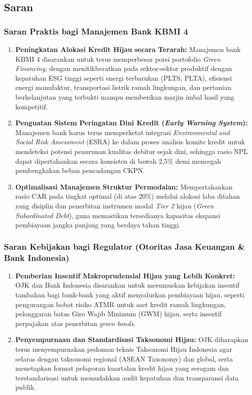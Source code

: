 \documentclass[12pt,a4paper]{article}
\numberwithin{equation}{section}
\begin{document}
\subsection{Saran}

\subsubsection{Saran Praktis bagi Manajemen Bank KBMI 4}
\begin{enumerate}[label=\alph*.]
  \item \textbf{Peningkatan Alokasi Kredit Hijau secara Terarah:} Manajemen bank KBMI 4 disarankan untuk terus memperbesar porsi portofolio \emph{Green Financing}, dengan menitikberatkan pada sektor-sektor produktif dengan kepatuhan ESG tinggi seperti energi terbarukan (PLTS, PLTA), efisiensi energi manufaktur, transportasi listrik ramah lingkungan, dan pertanian berkelanjutan yang terbukti mampu memberikan marjin imbal hasil yang kompetitif.
  \item \textbf{Penguatan Sistem Peringatan Dini Kredit (\emph{Early Warning System}):} Manajemen bank harus terus memperketat integrasi \emph{Environmental and Social Risk Assessment} (ESRA) ke dalam proses analisis komite kredit untuk mendeteksi potensi penurunan kualitas debitur sejak dini, sehingga rasio NPL dapat dipertahankan secara konsisten di bawah 2,5\% demi mencegah pembengkakan beban pencadangan CKPN.
  \item \textbf{Optimalisasi Manajemen Struktur Permodalan:} Mempertahankan rasio CAR pada tingkat optimal (di atas 20\%) melalui alokasi laba ditahan yang disiplin dan penerbitan instrumen modal \emph{Tier 2} hijau (\emph{Green Subordinated Debt}), guna memastikan tersedianya kapasitas ekspansi pembiayaan jangka panjang yang berdaya tahan tinggi.
\end{enumerate}

\subsubsection{Saran Kebijakan bagi Regulator (Otoritas Jasa Keuangan \& Bank Indonesia)}
\begin{enumerate}[label=\alph*.]
  \item \textbf{Pemberian Insentif Makroprudensial Hijau yang Lebih Konkret:} OJK dan Bank Indonesia disarankan untuk merumuskan kebijakan insentif tambahan bagi bank-bank yang aktif menyalurkan pembiayaan hijau, seperti pengurangan bobot risiko ATMR untuk aset kredit ramah lingkungan, pelonggaran batas Giro Wajib Minimum (GWM) hijau, serta insentif perpajakan atas penerbitan \emph{green bonds}.
  \item \textbf{Penyempurnaan dan Standardisasi Taksonomi Hijau:} OJK diharapkan terus menyempurnakan pedoman teknis Taksonomi Hijau Indonesia agar selaras dengan taksonomi regional (ASEAN Taxonomy) dan global, serta menetapkan format pelaporan kuartalan kredit hijau yang seragam dan terstandarisasi untuk memudahkan audit kepatuhan dan transparansi data publik.
\end{enumerate}
\end{document}
